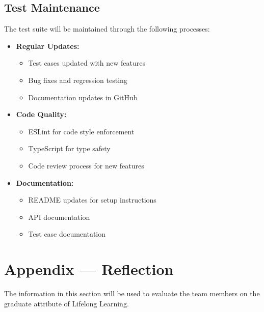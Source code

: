 \documentclass[12pt, titlepage]{article}
\begin{document}
\subsection{Test Maintenance}
The test suite will be maintained through the following processes:

\begin{itemize}
    \item \textbf{Regular Updates:}
    \begin{itemize}
        \item Test cases updated with new features
        \item Bug fixes and regression testing
        \item Documentation updates in GitHub
    \end{itemize}
    
    \item \textbf{Code Quality:}
    \begin{itemize}
        \item ESLint for code style enforcement
        \item TypeScript for type safety
        \item Code review process for new features
    \end{itemize}
    
    \item \textbf{Documentation:}
    \begin{itemize}
        \item README updates for setup instructions
        \item API documentation
        \item Test case documentation
    \end{itemize}
\end{itemize}

\newpage{}
\section*{Appendix --- Reflection}

The information in this section will be used to evaluate the team members on the
graduate attribute of Lifelong Learning.


\end{document}
